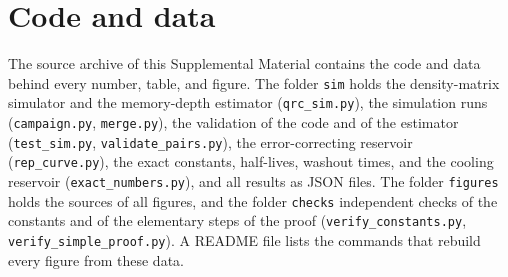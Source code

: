 \documentclass[aps,prl,twocolumn,superscriptaddress,floatfix]{revtex4-2}
\theoremstyle{plain}
\begin{document}
\section{Code and data}
\label{sm:code}

The source archive of this Supplemental Material contains the code and data behind every number, table, and figure. The folder \texttt{sim} holds the density-matrix simulator and the memory-depth estimator (\texttt{qrc\_sim.py}), the simulation runs (\texttt{campaign.py}, \texttt{merge.py}), the validation of the code and of the estimator (\texttt{test\_sim.py}, \texttt{validate\_pairs.py}), the error-correcting reservoir (\texttt{rep\_curve.py}), the exact constants, half-lives, washout times, and the cooling reservoir (\texttt{exact\_numbers.py}), and all results as JSON files. The folder \texttt{figures} holds the sources of all figures, and the folder \texttt{checks} independent checks of the constants and of the elementary steps of the proof (\texttt{verify\_constants.py}, \texttt{verify\_simple\_proof.py}). A README file lists the commands that rebuild every figure from these data.
\end{document}

